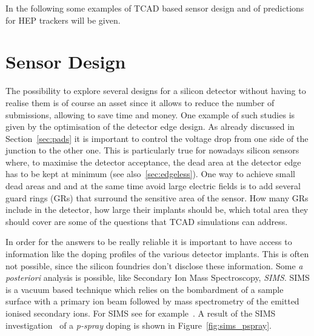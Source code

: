 In the following some examples of TCAD based sensor design and of predictions for HEP
trackers will be given.

\section{Sensor Design}
\label{sec:sensordesign}

The possibility to explore several designs for a silicon detector without having to realise them is 
of course an asset since it allows to reduce the number of submissions, allowing to save time 
and money. 
One example of such studies is given by the optimisation of the detector edge design. 
As already discussed in Section~\ref{sec:pads} it is important to control the voltage 
drop from one side of the junction to the other one. This is particularly true for nowadays 
silicon sensors where, to maximise the detector acceptance, the dead area at the 
detector edge has to be kept at minimum (see also~\ref{sec:edgeless}). One way to achieve 
small dead areas and and at the same time avoid large electric fields is to add several 
guard rings (GRs) that surround the sensitive area of the sensor. How many GRs include in 
the detector, how large their implants should be, which total area they should cover are 
some of the questions that TCAD simulations can address. 

In order for the answers to be really reliable it is important to have access to information 
like the doping profiles of the various detector implants. This is often not possible, since 
the silicon foundries don't disclose these information. Some {\it a posteriori} analysis is possible, 
like Secondary Ion Mass Spectroscopy, {\it SIMS}. SIMS is a vacuum based technique 
which relies on the bombardment of a sample surface with a primary ion 
beam  followed  by  mass  spectrometry  of  the 
 emitted  ionised  secondary  ions.  For SIMS see for example~\cite{dinu:tel-00872318}.
A result of the SIMS investigation~\cite{SIMS} of a {\it p-spray} doping is shown in Figure~\ref{fig:sims_pspray}. 

